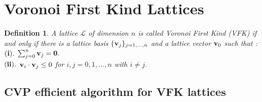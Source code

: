\documentclass{amsart}
\newtheorem{definition}[theorem]{Definition}
\numberwithin{equation}{section}
\def\L{\mathcal{L}}
\begin{document}
\section{Voronoi First Kind Lattices}\label{sec:VFK}
	\begin{definition}
A lattice $\L$ of dimension $n$ is called Voronoi First Kind (VFK) if and only if there is a lattice basis $\{{\bf v}_j\}_{j=1,...,n}$ and a lattice vector ${\bf v}_{0}$ such that :\\
$({\bf i}).$ $\sum_{j=0}^{n}{\bf v}_j ={\bf 0}.$\\
$({\bf ii}).$ ${\bf v}_i\cdot {\bf v}_j \leq 0$ for $i,j=0,1,...,n$ with $i\not =j.$
\end{definition}
\subsection{CVP efficient algorithm for VFK lattices}
\end{document}
